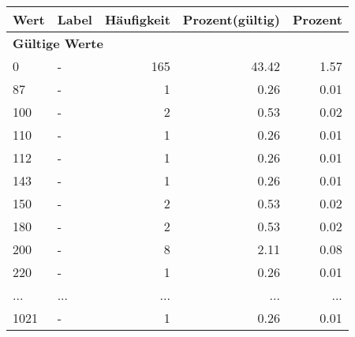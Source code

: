      \begin{longtable}{lXrrr}
     \toprule
     \textbf{Wert} & \textbf{Label} & \textbf{Häufigkeit} & \textbf{Prozent(gültig)} & \textbf{Prozent} \\
     \endhead
     \midrule
     \multicolumn{5}{l}{\textbf{Gültige Werte}}\\
        0 & \multicolumn{1}{X}{-} & %
          \num{165} &
          \num[round-mode=places,round-precision=2]{43.42} &
          \num[round-mode=places,round-precision=2]{1.57} \\
        87 & \multicolumn{1}{X}{-} & %
          \num{1} &
          \num[round-mode=places,round-precision=2]{0.26} &
          \num[round-mode=places,round-precision=2]{0.01} \\
        100 & \multicolumn{1}{X}{-} & %
          \num{2} &
          \num[round-mode=places,round-precision=2]{0.53} &
          \num[round-mode=places,round-precision=2]{0.02} \\
        110 & \multicolumn{1}{X}{-} & %
          \num{1} &
          \num[round-mode=places,round-precision=2]{0.26} &
          \num[round-mode=places,round-precision=2]{0.01} \\
        112 & \multicolumn{1}{X}{-} & %
          \num{1} &
          \num[round-mode=places,round-precision=2]{0.26} &
          \num[round-mode=places,round-precision=2]{0.01} \\
        143 & \multicolumn{1}{X}{-} & %
          \num{1} &
          \num[round-mode=places,round-precision=2]{0.26} &
          \num[round-mode=places,round-precision=2]{0.01} \\
        150 & \multicolumn{1}{X}{-} & %
          \num{2} &
          \num[round-mode=places,round-precision=2]{0.53} &
          \num[round-mode=places,round-precision=2]{0.02} \\
        180 & \multicolumn{1}{X}{-} & %
          \num{2} &
          \num[round-mode=places,round-precision=2]{0.53} &
          \num[round-mode=places,round-precision=2]{0.02} \\
        200 & \multicolumn{1}{X}{-} & %
          \num{8} &
          \num[round-mode=places,round-precision=2]{2.11} &
          \num[round-mode=places,round-precision=2]{0.08} \\
        220 & \multicolumn{1}{X}{-} & %
          \num{1} &
          \num[round-mode=places,round-precision=2]{0.26} &
          \num[round-mode=places,round-precision=2]{0.01} \\
       ... & ... & ... & ... & ... \\
        1021 & \multicolumn{1}{X}{-} & %
          \num{1} &
          \num[round-mode=places,round-precision=2]{0.26} &
          \num[round-mode=places,round-precision=2]{0.01} \\


\end{longtable}
